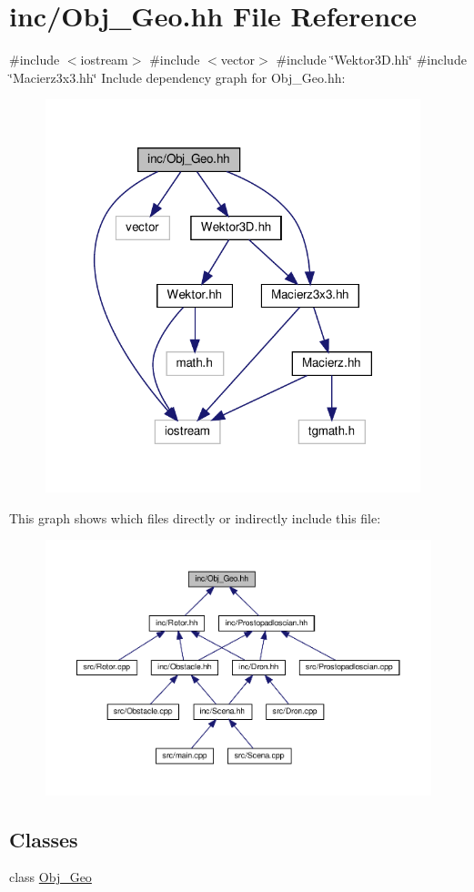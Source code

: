 \hypertarget{_obj___geo_8hh}{}\section{inc/\+Obj\+\_\+\+Geo.hh File Reference}
\label{_obj___geo_8hh}
{\ttfamily \#include $<$iostream$>$}\newline
{\ttfamily \#include $<$vector$>$}\newline
{\ttfamily \#include \char`\"{}Wektor3\+D.\+hh\char`\"{}}\newline
{\ttfamily \#include \char`\"{}Macierz3x3.\+hh\char`\"{}}\newline
Include dependency graph for Obj\+\_\+\+Geo.\+hh\+:
\nopagebreak
\begin{figure}[H]
\begin{center}
\leavevmode
\includegraphics[width=309pt]{_obj___geo_8hh__incl}
\end{center}
\end{figure}
This graph shows which files directly or indirectly include this file\+:
\nopagebreak
\begin{figure}[H]
\begin{center}
\leavevmode
\includegraphics[width=350pt]{_obj___geo_8hh__dep__incl}
\end{center}
\end{figure}
\subsection*{Classes}
\begin{DoxyCompactItemize}
\item 
class \hyperlink{class_obj___geo}{Obj\+\_\+\+Geo}
\end{DoxyCompactItemize}
